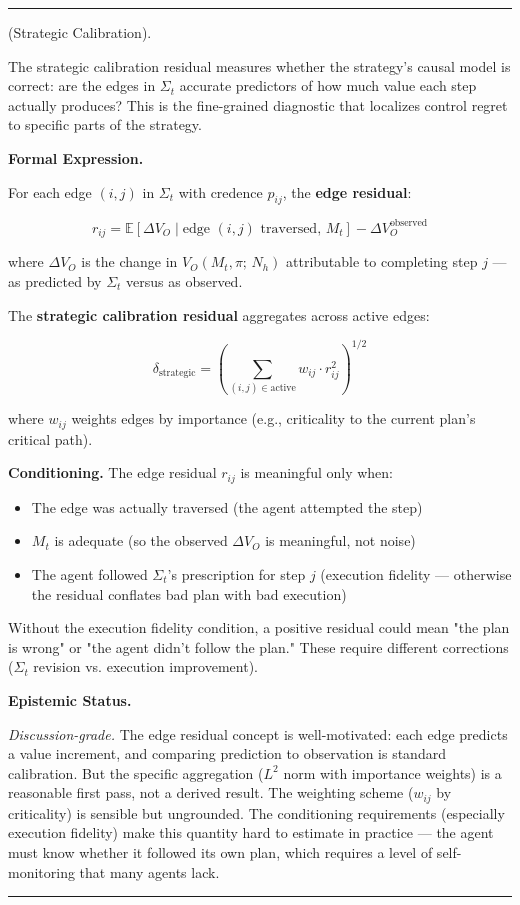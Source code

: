 \documentclass[11pt,oneside]{article}
\newcounter{claim}[section]
\renewcommand{\theclaim}{\thesection.\arabic{claim}}
\newenvironment{segment}[2]{%
  \refstepcounter{claim}%
  \bigskip\noindent\hrule\smallskip
  \noindent{\bfseries #1~\theclaim}\enskip(#2).\par\smallskip
  \noindent\ignorespaces
}{%
  \par\smallskip\noindent\hrule\bigskip
}
\newenvironment{definition}[1][]{\begin{segment}{Definition}{#1}}{\end{segment}}
\begin{document}
\begin{definition}[Strategic Calibration]
\label{strategic-calibration}
The strategic calibration residual measures whether the strategy's causal model is correct: are the edges in $\Sigma_t$ accurate predictors of how much value each step actually produces? This is the fine-grained diagnostic that localizes control regret to specific parts of the strategy.



\medskip\noindent\textbf{Formal Expression.}



For each edge $(i, j)$ in $\Sigma_t$ with credence $p_{ij}$, the \textbf{edge residual}:

$$r_{ij} = \mathbb{E}[\Delta V_O \mid \text{edge } (i,j) \text{ traversed},\, M_t] - \Delta V_O^{\text{observed}}$$

where $\Delta V_O$ is the change in $V_O(M_t, \pi;\, N_h)$ attributable to completing step $j$ — as predicted by $\Sigma_t$ versus as observed.

The \textbf{strategic calibration residual} aggregates across active edges:

$$\delta_{\text{strategic}} = \left(\sum_{(i,j) \in \text{active}} w_{ij} \cdot r_{ij}^2 \right)^{1/2}$$

where $w_{ij}$ weights edges by importance (e.g., criticality to the current plan's critical path).

\textbf{Conditioning.} The edge residual $r_{ij}$ is meaningful only when:
\begin{itemize}
  \item The edge was actually traversed (the agent attempted the step)
  \item $M_t$ is adequate (so the observed $\Delta V_O$ is meaningful, not noise)
  \item The agent followed $\Sigma_t$'s prescription for step $j$ (execution fidelity — otherwise the residual conflates bad plan with bad execution)
\end{itemize}


Without the execution fidelity condition, a positive residual could mean "the plan is wrong" or "the agent didn't follow the plan." These require different corrections ($\Sigma_t$ revision vs. execution improvement).


\medskip\noindent\textbf{Epistemic Status.}


\textit{Discussion-grade.} The edge residual concept is well-motivated: each edge predicts a value increment, and comparing prediction to observation is standard calibration. But the specific aggregation ($L^2$ norm with importance weights) is a reasonable first pass, not a derived result. The weighting scheme ($w_{ij}$ by criticality) is sensible but ungrounded. The conditioning requirements (especially execution fidelity) make this quantity hard to estimate in practice — the agent must know whether it followed its own plan, which requires a level of self-monitoring that many agents lack.


\end{definition}
\end{document}
